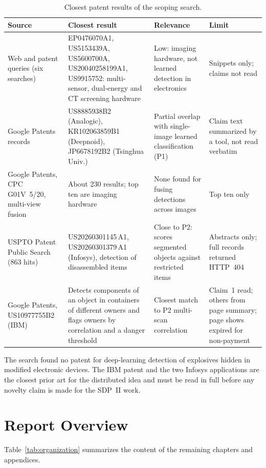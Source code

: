 \begin{table}[htbp]
\centering\tablesetup
\caption{Closest patent results of the scoping search.}
\label{tab:patents}
\begin{tabularx}{\textwidth}{@{}L{0.19\textwidth}L{0.27\textwidth}YY@{}}
\toprule
Source & Closest result & Relevance & Limit\\
\midrule
Web and patent queries (six searches) & EP0476070A1, US5153439A, US5600700A,
US20040258199A1, US9915752: multi-sensor, dual-energy and CT screening hardware &
Low: imaging hardware, not learned detection in electronics & Snippets only;
claims not read\\
Google Patents records & US8885938B2 (Analogic), KR102063859B1 (Deepnoid),
JP6678192B2 (Tsinghua Univ.) & Partial overlap with single-image learned
classification (P1) & Claim text summarized by a tool, not read verbatim\\
Google Patents, CPC G01V~5/20, multi-view fusion & About 230 results; top ten are
imaging hardware & None found for fusing detections across images & Top ten only\\
USPTO Patent Public Search (863 hits) & US20260301145\,A1, US20260301379\,A1
(Infosys), detection of disassembled items & Close to P2: scores segmented objects
against restricted items & Abstracts only; full records returned HTTP~404\\
Google Patents, US10977755B2 (IBM) & Detects components of an object in
containers of different owners and flags owners by correlation and a danger
threshold & Closest match to P2 multi-scan correlation & Claim~1 read; others
from page summary; page shows expired for non-payment\\
\bottomrule
\end{tabularx}
\end{table}

The search found no patent for deep-learning detection of explosives hidden in
modified electronic devices. The IBM patent and the two Infosys applications are
the closest prior art for the distributed idea and must be read in full before
any novelty claim is made for the SDP~II work.

\section{Report Overview}
\label{sec:overview}
Table~\ref{tab:organization} summarizes the content of the remaining chapters and
appendices.

